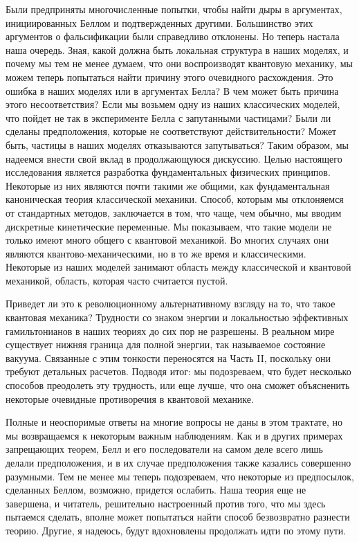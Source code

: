 \documentclass[main.tex]{subfiles}
\begin{document}
Были предприняты многочисленные попытки, чтобы найти дыры в аргументах, инициированных Беллом и подтвержденных другими. Большинство этих аргументов о фальсификации были справедливо отклонены. Но теперь настала наша очередь. Зная, какой должна быть локальная структура в наших моделях, и почему мы тем не менее думаем, что они воспроизводят квантовую механику, мы можем теперь попытаться найти причину этого очевидного расхождения. Это ошибка в наших моделях или в аргументах Белла? В чем может быть причина этого несоответствия? Если мы возьмем одну из наших классических моделей, что пойдет не так в эксперименте Белла с запутанными частицами? Были ли сделаны предположения, которые не соответствуют действительности? Может быть, частицы в наших моделях отказываются запутываться? Таким образом, мы надеемся внести свой вклад в продолжающуюся дискуссию. Целью настоящего исследования является разработка фундаментальных физических принципов. Некоторые из них являются почти такими же общими, как фундаментальная каноническая теория классической механики. Способ, которым мы отклоняемся от стандартных методов, заключается в том, что чаще, чем обычно, мы вводим дискретные кинетические переменные. Мы показываем, что такие модели не только имеют много общего с квантовой механикой. Во многих случаях они являются квантово-механическими, но в то же время и классическими. Некоторые из наших моделей занимают область между классической и квантовой механикой, область, которая часто считается пустой. 

Приведет ли это к революционному альтернативному взгляду на то, что такое квантовая механика? Трудности со знаком энергии и локальностью эффективных гамильтонианов в наших теориях до сих пор не разрешены. В реальном мире существует нижняя граница для полной энергии, так называемое состояние вакуума. Связанные с этим тонкости переносятся на Часть II, поскольку они требуют детальных расчетов. Подводя итог: мы подозреваем, что будет несколько способов преодолеть эту трудность, или еще лучше, что она сможет объясненить некоторые очевидные противоречия в квантовой механике. 

Полные и неоспоримые ответы на многие вопросы не даны в этом трактате, но мы возвращаемся к некоторым важным наблюдениям. Как и в других примерах запрещающих теорем, Белл и его последователи на самом деле всего лишь делали предположения, и в их случае предположения также казались совершенно разумными. Тем не менее мы теперь подозреваем, что некоторые из предпосылок, сделанных Беллом, возможно, придется ослабить. Наша теория еще не завершена, и читатель, решительно настроенный против того, что мы здесь пытаемся сделать, вполне может попытаться найти способ безвозвратно разнести теорию. Другие, я надеюсь, будут вдохновлены продолжать идти по этому пути.
\end{document}
